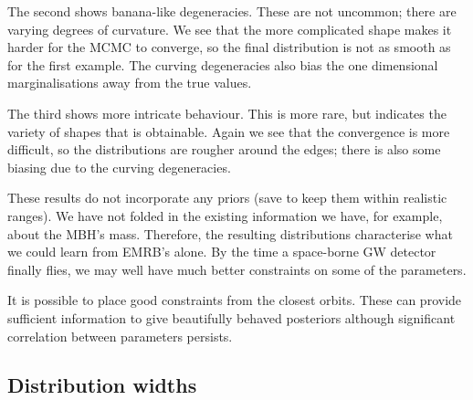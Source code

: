 \documentclass[useAMS,usedcolumn,usegraphicx,usenatbib]{mn2e}
\begin{document}
The second shows banana-like degeneracies. These are not uncommon; there are varying degrees of curvature. We see that the more complicated shape makes it harder for the MCMC to converge, so the final distribution is not as smooth as for the first example. The curving degeneracies also bias the one dimensional marginalisations away from the true values.

The third shows more intricate behaviour. This is more rare, but indicates the variety of shapes that is obtainable. Again we see that the convergence is more difficult, so the distributions are rougher around the edges; there is also some biasing due to the curving degeneracies.

These results do not incorporate any priors (save to keep them within realistic ranges). We have not folded in the existing information we have, for example, about the MBH's mass. Therefore, the resulting distributions characterise what we could learn from EMRB's alone. By the time a space-borne GW detector finally flies, we may well have much better constraints on some of the parameters.

It is possible to place good constraints from the closest orbits. These can provide sufficient information to give beautifully behaved posteriors although significant correlation between parameters persists.

\subsection{Distribution widths}
\end{document}
